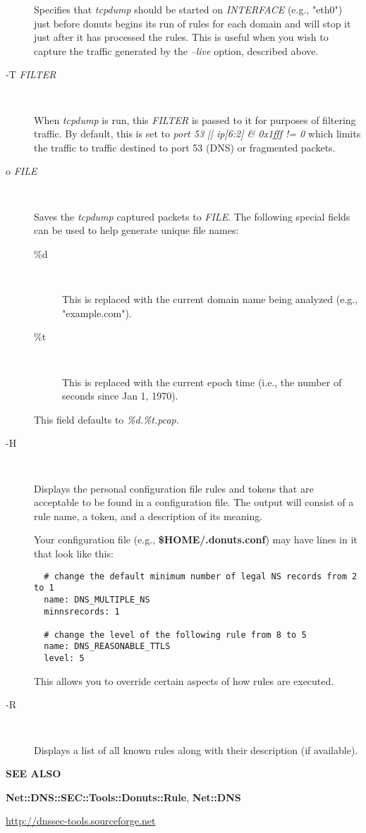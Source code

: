 \begin{description}
Specifies that {\it tcpdump} should be started on {\it INTERFACE} (e.g.,
"eth0") just before donuts begins its run of rules for each domain
and will stop it just after it has processed the rules.  This is
useful when you wish to capture the traffic generated by the {\it --live}
option, described above.

\item [-T {\it FILTER}]\verb" "

When {\it tcpdump} is run, this {\it FILTER} is passed to it for purposes of
filtering traffic.  By default, this is set to {\it port 53 || ip[6:2] \&
0x1fff != 0} which limits the traffic to traffic destined to port 53
(DNS) or fragmented packets.

\item [o {\it FILE}]\verb" "

Saves the {\it tcpdump} captured packets to {\it FILE}.  The following
special fields can be used to help generate unique file names:

\begin{description}

\item [\%d]\verb" "

This is replaced with the current domain name being analyzed (e.g.,
"example.com").

\item [\%t]\verb" "

This is replaced with the current epoch time (i.e., the number of
seconds since Jan 1, 1970).

\end{description}

This field defaults to {\it \%d.\%t.pcap}.

\item [-H]\verb" "

Displays the personal configuration file rules and tokens that are
acceptable to be found in a configuration file.  The output will
consist of a rule name, a token, and a description of its meaning.

Your configuration file (e.g., {\bf \$HOME/.donuts.conf}) may have lines in it
that look like this:

\begin{verbatim}
  # change the default minimum number of legal NS records from 2 to 1
  name: DNS_MULTIPLE_NS
  minnsrecords: 1

  # change the level of the following rule from 8 to 5
  name: DNS_REASONABLE_TTLS
  level: 5
\end{verbatim}

This allows you to override certain aspects of how rules are executed.

\item [-R]\verb" "

Displays a list of all known rules along with their description (if available).

\end{description}

{\bf SEE ALSO}

{\bf Net::DNS::SEC::Tools::Donuts::Rule}, {\bf Net::DNS}

\url{http://dnssec-tools.sourceforge.net}

